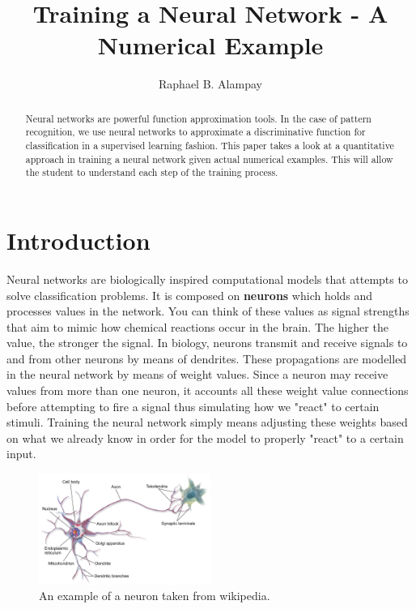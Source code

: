 \documentclass[a4paper]{article}
\title{Training a Neural Network - A Numerical Example}
\author{Raphael B. Alampay}
\begin{document}
\maketitle

\begin{abstract}
Neural networks are powerful function approximation tools. In the case of pattern recognition, we use neural networks to approximate a discriminative function for classification in a supervised learning fashion. This paper takes a look at a quantitative approach in training a neural network given actual numerical examples. This will allow the student to understand each step of the training process.
\end{abstract}

\section{Introduction}
Neural networks are biologically inspired computational models that attempts to solve classification problems. It is composed on \textbf{neurons} which holds and processes values in the network. You can think of these values as signal strengths that aim to mimic how chemical reactions occur in the brain. The higher the value, the stronger the signal. In biology, neurons transmit and receive signals to and from other neurons by means of dendrites. These propagations are modelled in the neural network by means of weight values. Since a neuron may receive values from more than one neuron, it accounts all these weight value connections before attempting to fire a signal thus simulating how we "react" to certain stimuli. Training the neural network simply means adjusting these weights based on what we already know in order for the model to properly "react" to a certain input.

\begin{figure}[!htb]
\centering
\includegraphics[width=0.5\textwidth]{neuron.png}
\caption{\label{fig:neuron}An example of a neuron taken from wikipedia.}
\end{figure}
\end{document}
